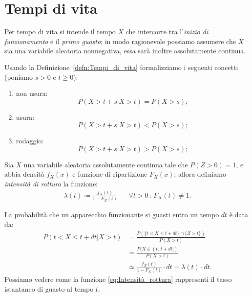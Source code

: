     \section{Tempi di vita}
    \begin{defn}\label{defn:Tempi_di_vita}
            Per tempo di vita si intende il tempo $X$ che intercorre tra l'\textit{inizio di funzionamento} e il \textit{primo guasto}; in modo ragionevole possiamo assumere che $X$ sia una variabile aleatoria non\nbdash negativa, essa sarà inoltre assolutamente continua.
        \end{defn}
        \begin{prty}\label{prty:Tempi_di_vita}
            Usando la Definizione~\ref{defn:Tempi_di_vita} formalizziamo i seguenti concetti (ponia\-mo $s > 0$ e $t \geq 0$):
            \begin{enumerate}
                \item non usura: \[\label{itm:Non_usura}
                        P(X > t + s | X > t)
                        = P(X > s)
                ;\] 
                \item usura: \[\label{itm:Usura}
                        P(X > t + s | X > t)
                        < P(X > s)
                ;\] 
                \item rodaggio: \[\label{itm:Rodaggio}
                        P(X > t + s | X > t)
                        > P(X > s)
                ;\] 
            \end{enumerate}
        \end{prty}
        \begin{defn}
            Sia $X$ una variabile aleatoria assolutamente continua tale che $P(Z > 0) = 1$, e abbia densità $f_X(x)$ e funzione di ripartizione $F_X(x)$; allora definiamo \textit{intensità di rottura} la funzione:
            \begin{align}\label{eq:Intensità_rottura}
                \lambda(t) \coloneqq \frac{f_X(t)}{1 - F_X(t)} & & \forall t>0 \,:\, F_X(t) \neq 1
            .\end{align}
        \end{defn}
        \begin{obsv}
            La probabilità che un apparecchio funzionante si guasti entro un tempo $dt$ è data da:
            \begin{align*}
                P(t < X \leq t + dt | X > t) &= \frac{P(\{t < X \leq t + dt\} \cap \{Z > t\})}{P(X > t)} \\
                                             &= \frac{P(X \in (t,\, t+dt])}{P(X > t)} \\
                                             &\simeq \frac{f_X(t)}{1 - F_X(t)} \cdot dt = \lambda(t)\cdot dt
            .\end{align*}
            Possiamo vedere come la funzione \eqref{eq:Intensità_rottura} rappresenti il tasso istantaneo di guasto al tempo $t$.
        \end{obsv}
